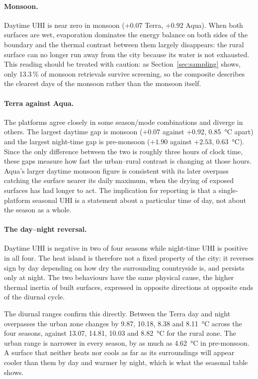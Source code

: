 \documentclass[11pt,a4paper]{article}
\begin{document}
\paragraph{Monsoon.}
Daytime UHI is near zero in monsoon ($+0.07$ Terra, $+0.92$ Aqua).
When both surfaces are wet, evaporation dominates the energy balance
on both sides of the boundary and the thermal contrast between them
largely disappears: the rural surface can no longer run away from
the city because its water is not exhausted. This reading should be
treated with caution: as Section~\ref{sec:sampling} shows, only
13.3\,\% of monsoon retrievals survive screening, so the composite
describes the clearest days of the monsoon rather than the monsoon
itself.

\paragraph{Terra against Aqua.}
The platforms agree closely in some season/mode combinations and
diverge in others. The largest daytime gap is monsoon ($+0.07$ against
$+0.92$, \SI{0.85}{\degreeCelsius} apart) and the largest night-time
gap is pre-monsoon ($+1.90$ against $+2.53$,
\SI{0.63}{\degreeCelsius}). Since the only difference between the two
is roughly three hours of clock time, these gaps measure how fast the
urban--rural contrast is changing at those hours. Aqua's larger
daytime monsoon figure is consistent with its later overpass catching
the surface nearer its daily maximum, when the drying of exposed
surfaces has had longer to act. The implication for reporting is that
a single-platform seasonal UHI is a statement about a particular time
of day, not about the season as a whole.

\paragraph{The day--night reversal.}
Daytime UHI is negative in two of four seasons while night-time UHI is
positive in all four. The heat island is therefore not a fixed
property of the city: it reverses sign by day depending on how dry the
surrounding countryside is, and persists only at night. The two
behaviours have the same physical cause, the higher thermal inertia of
built surfaces, expressed in opposite directions at opposite ends of
the diurnal cycle.

The diurnal ranges confirm this directly. Between the Terra day and
night overpasses the urban zone changes by \SI{9.87}{},
\SI{10.18}{}, \SI{8.38}{} and \SI{8.11}{\degreeCelsius} across the
four seasons, against \SI{13.07}{}, \SI{14.81}{}, \SI{10.03}{} and
\SI{8.82}{\degreeCelsius} for the rural zone. The urban range is
narrower in every season, by as much as
\SI{4.62}{\degreeCelsius} in pre-monsoon. A surface that neither heats
nor cools as far as its surroundings will appear cooler than them by
day and warmer by night, which is what the seasonal table shows.
\end{document}
